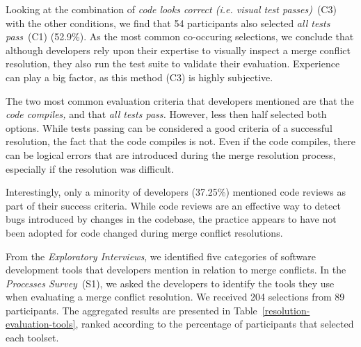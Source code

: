 Looking at the combination of \textit{code looks correct (i.e. visual test passes)}~(C3) with the other conditions, we find that 54 participants also selected \textit{all tests pass}~(C1) (52.9\%).
As the most common co-occuring selections, we conclude that although developers rely upon their expertise to visually inspect a merge conflict resolution, they also run the test suite to validate their evaluation.
Experience can play a big factor, as this method (C3) is highly subjective.

The two most common evaluation criteria that developers mentioned are that the \emph{code compiles,} and that \emph{all tests pass.}
However, less then half selected both options.
While tests passing can be considered a good criteria of a successful resolution, the fact that the code compiles is not.
Even if the code compiles, there can be logical errors that are introduced during the merge resolution process, especially if the resolution was difficult.

Interestingly, only a minority of developers (37.25\%) mentioned code reviews as part of their success criteria.
While code reviews are an effective way to detect bugs introduced by changes in the codebase, the practice appears to have not been adopted for code changed during merge conflict resolutions.


From the \textit{Exploratory Interviews}, we identified five categories of software development tools that developers mention in relation to merge conflicts.
In the \textit{Processes Survey}~(S1), we asked the developers to identify the tools they use when evaluating a merge conflict resolution.
We received 204 selections from 89 participants.
The aggregated results are presented in Table~\ref{resolution-evaluation-tools}, ranked according to the percentage of participants that selected each toolset.

